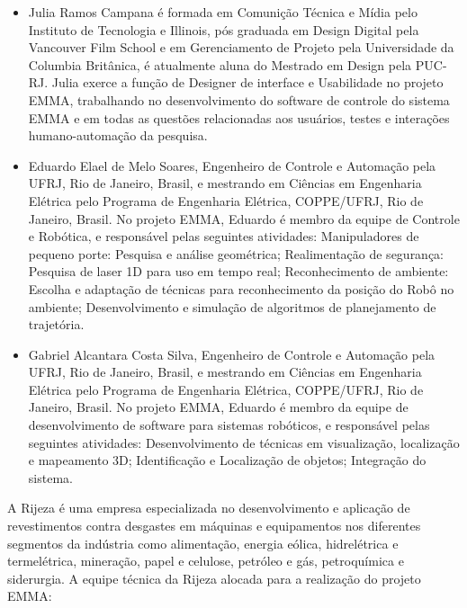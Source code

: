 \begin{itemize}
\item Julia Ramos Campana é formada em Comunição Técnica e Mídia pelo Instituto de
Tecnologia e Illinois, pós graduada em Design Digital pela Vancouver Film School
e em Gerenciamento de Projeto pela Universidade da Columbia Britânica, é
atualmente aluna do Mestrado em Design pela PUC-RJ. Julia exerce a função de
Designer de interface e Usabilidade no projeto EMMA, trabalhando no
desenvolvimento do software de controle do sistema EMMA e em todas as questões
relacionadas aos usuários, testes e interações humano-automação da pesquisa.
\item Eduardo Elael de Melo Soares, Engenheiro de Controle e Automação pela UFRJ, Rio
de Janeiro, Brasil, e mestrando em Ciências em Engenharia Elétrica pelo
Programa de Engenharia Elétrica, COPPE/UFRJ, Rio de Janeiro, Brasil. No projeto
EMMA, Eduardo é membro da equipe de Controle e Robótica, e responsável pelas
seguintes atividades: Manipuladores de pequeno porte: Pesquisa e análise
geométrica; Realimentação de segurança: Pesquisa de laser 1D para uso em tempo
real; Reconhecimento de ambiente: Escolha e adaptação de técnicas para
reconhecimento da posição do Robô no ambiente; Desenvolvimento e simulação de
algoritmos de planejamento de trajetória.
\item Gabriel Alcantara Costa Silva, Engenheiro de Controle e Automação pela
UFRJ, Rio de Janeiro, Brasil, e mestrando em Ciências em Engenharia Elétrica pelo
Programa de Engenharia Elétrica, COPPE/UFRJ, Rio de Janeiro, Brasil. No projeto
EMMA, Eduardo é membro da equipe de desenvolvimento de software para sistemas
robóticos, e responsável pelas seguintes atividades: Desenvolvimento de técnicas
em visualização, localização e mapeamento 3D; Identificação e
Localização de objetos; Integração do sistema.

\end{itemize}


A Rijeza é uma empresa especializada no desenvolvimento e aplicação de
revestimentos contra desgastes em máquinas e equipamentos nos diferentes
segmentos da indústria como alimentação, energia eólica, hidrelétrica e
termelétrica, mineração, papel e celulose, petróleo e gás, petroquímica e siderurgia.
A equipe técnica da Rijeza alocada para a realização do projeto EMMA:


